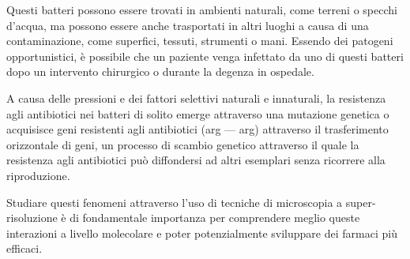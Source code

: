\documentclass[../main.tex]{subfiles}
\begin{document}
Questi batteri possono essere trovati in ambienti naturali, come terreni o specchi d'acqua, ma possono essere anche trasportati in altri luoghi a causa di una contaminazione, come superfici, tessuti, strumenti o mani. Essendo dei patogeni opportunistici, è possibile che un paziente venga infettato da uno di questi batteri dopo un intervento chirurgico o durante la degenza in ospedale.\cite{cdc_2019}

A causa delle pressioni e dei fattori selettivi naturali e innaturali, la resistenza agli antibiotici nei batteri di solito emerge attraverso una mutazione genetica o acquisisce geni resistenti agli antibiotici (\acrlong{arg} --- \acrshort{arg}) attraverso il trasferimento orizzontale di geni, un processo di scambio genetico attraverso il quale la resistenza agli antibiotici può diffondersi ad altri esemplari senza ricorrere alla riproduzione.\cite{madigan_2015}\bigskip

\noindent Studiare questi fenomeni attraverso l'uso di tecniche di microscopia a super-risoluzione è di fondamentale importanza per comprendere meglio queste interazioni a livello molecolare e poter potenzialmente sviluppare dei farmaci più efficaci.
\end{document}
